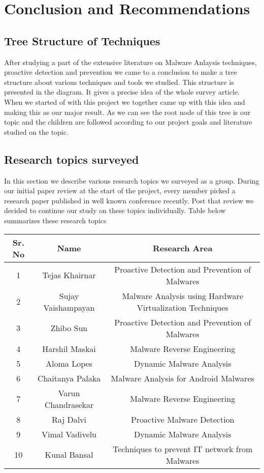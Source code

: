 \documentclass[11pt]{article}
\begin{document}
	
	

	\section{Conclusion and Recommendations}
	\subsection{Tree Structure of Techniques}
	After studying a part of the extensive literature on Malware Anlaysis techniques, proactive detection and prevention we came to a conclusion to make a tree structure about various techniques and tools we studied. This structure is presented in the diagram. It gives a precise idea of the whole survey article. When we started of with this project we together came up with this idea and making this as our major result. 
	As we can see the root node of this tree is our topic and the children are followed according to our project goals and literature studied on the topic.
	
	\subsection{Research topics surveyed}
	In this section we describe various research topics we surveyed as a group. During our initial paper review at the start of the project, every member picked a research paper published in well known conference recently. Post that review we decided to continue our study on these topics individually. Table below summarizes these research topics 
	\begin{table}
		\centering
		\begin{tabular}{ccc}
			\hline
			Sr. No & Name & Research Area\\
			\hline
			1 & Tejas Khairnar & Proactive Detection and Prevention of Malwares\\
			\hline
			2 & Sujay Vaishampayan & Malware Analysis using Hardware Virtualization	Techniques\\
			\hline
			3 & Zhibo Sun & Proactive Detection and Prevention of Malwares\\
			\hline
			4 & Harshil Maskai & Malware Reverse Engineering\\
			\hline
			5 & Aloma Lopes & Dynamic Malware Analysis\\
			\hline
			6 & Chaitanya Palaka & Malware Analysis for Android Malwares\\
			\hline
			7 & Varun Chandrasekar & Malware Reverse Engineering\\
			\hline
			8 & Raj Dalvi & Proactive Malware Detection\\
			\hline
			9 & Vimal Vadivelu & Dynamic Malware Analysis\\
			\hline
			10 & Kunal Bansal & Techniques to prevent IT network from Malwares\\
			\hline
		\end{tabular}
	\label{tab:Research_Areas}
	\end{table}
\end{document}
